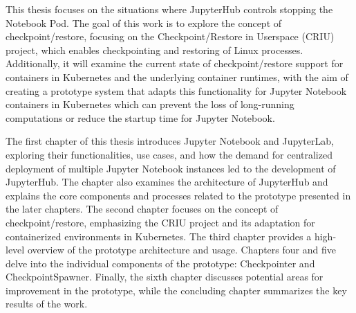 \documentclass[
  digital,     %
  oneside,     %
  nosansbold,  %
  nocolorbold, %
  lof,         %
  nolot,         %
]{fithesis4}
\begin{document}
This thesis focuses on the situations where JupyterHub controls stopping the Notebook Pod. The goal of this work is to explore the concept of checkpoint/restore, focusing on the Checkpoint/Restore in Userspace (CRIU) project, which enables checkpointing and restoring of Linux processes. Additionally, it will examine the current state of checkpoint/restore support for containers in Kubernetes and the underlying container runtimes, with the aim of creating a prototype system that adapts this functionality for Jupyter Notebook containers in Kubernetes which can prevent the loss of long-running computations or reduce the startup time for Jupyter Notebook.

The first chapter of this thesis introduces Jupyter Notebook and JupyterLab, exploring their functionalities, use cases, and how the demand for centralized deployment of multiple Jupyter Notebook instances led to the development of JupyterHub. The chapter also examines the architecture of JupyterHub and explains the core components and processes related to the prototype presented in the later chapters. The second chapter focuses on the concept of checkpoint/restore, emphasizing the CRIU project and its adaptation for containerized environments in Kubernetes. The third chapter provides a high-level overview of the prototype architecture and usage. Chapters four and five delve into the individual components of the prototype: Checkpointer and CheckpointSpawner. Finally, the sixth chapter discusses potential areas for improvement in the prototype, while the concluding chapter summarizes the key results of the work.




\end{document}
